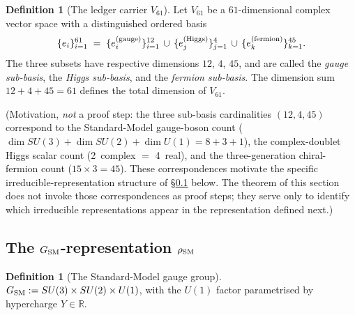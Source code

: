 \documentclass[11pt]{article}
\theoremstyle{plain}
\theoremstyle{definition}
\newtheorem{definition}[theorem]{Definition}
\theoremstyle{remark}
\begin{document}
\begin{definition}[The ledger carrier $V_{61}$]\label{def:V61}
Let $V_{61}$ be a $61$-dimensional complex vector space with a distinguished ordered basis
\[
  \{e_i\}_{i=1}^{61}
  \;=\; \{e_i^{(\rm gauge)}\}_{i=1}^{12} \,\cup\, \{e_j^{(\rm Higgs)}\}_{j=1}^{4} \,\cup\, \{e_k^{(\rm fermion)}\}_{k=1}^{45}.
\]
The three subsets have respective dimensions $12$, $4$, $45$, and are called the \emph{gauge sub-basis}, the \emph{Higgs sub-basis}, and the \emph{fermion sub-basis}.  The dimension sum $12 + 4 + 45 = 61$ defines the total dimension of $V_{61}$.
\end{definition}

\noindent (Motivation, \emph{not} a proof step: the three sub-basis cardinalities $(12, 4, 45)$ correspond to the Standard-Model gauge-boson count ($\dim SU(3) + \dim SU(2) + \dim U(1) = 8+3+1$), the complex-doublet Higgs scalar count (2~complex $=$ 4~real), and the three-generation chiral-fermion count ($15 \times 3 = 45$).  These correspondences motivate the specific irreducible-representation structure of \S\ref{supp:kernel_GSM} below.  The theorem of this section does not invoke those correspondences as proof steps; they serve only to identify which irreducible representations appear in the representation defined next.)

\bigskip

\subsection{The $G_{\rm SM}$-representation $\rho_{\rm SM}$}\label{supp:kernel_GSM}

\begin{definition}[The Standard-Model gauge group]\label{def:GSM}
$G_{\rm SM} := SU(3) \times SU(2) \times U(1)$, with the $U(1)$ factor parametrised by hypercharge $Y \in \mathbb{R}$.
\end{definition}
\end{document}
